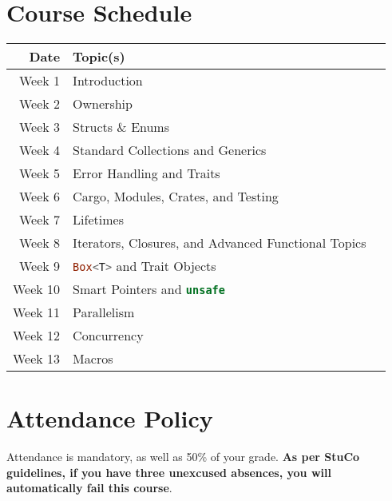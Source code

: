 \documentclass{article}
\newcommand{\code}[2][]{{\sloppy
\ifmmode
\text{\lstinline[language=rust,#1]`#2`}
\else
{\lstinline[language=rust,#1]`#2`}%
\fi}}
\begin{document}

\clearpage


\section*{Course Schedule}

\begin{longtable}{rp{}@{\hskip .075\textwidth}p{}}
    Date        & Topic(s)      \\ 
    \toprule
    Week 1      & Introduction \\
    Week 2      & Ownership \\
    Week 3      & Structs \& Enums \\
    Week 4      & Standard Collections and Generics \\
    Week 5      & Error Handling and Traits \\
    Week 6      & Cargo, Modules, Crates, and Testing \\
    Week 7      & Lifetimes \\
    Week 8      & Iterators, Closures, and Advanced Functional Topics \\
    Week 9      & \code{Box<T>} and Trait Objects \\
    Week 10     & Smart Pointers and \code{unsafe} \\
    Week 11     & Parallelism \\
    Week 12     & Concurrency \\
    Week 13     & Macros \\
    \bottomrule
\end{longtable}


\section*{Attendance Policy}

Attendance is mandatory, as well as 50\% of your grade.
\textbf{As per StuCo guidelines, if you have three
unexcused absences, you will automatically fail this course}.

\end{document}
